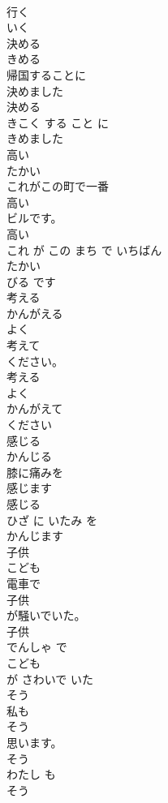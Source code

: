 \documentclass[8pt]{extreport}
\begin{document}
\begin{CJK}{UTF8}{min}
\\	行く	
\\	いく	
\\	決める	
\\	きめる	
\\	帰国することに
\\	決めました
\\	決める 
\\	きこく する こと に 
\\	きめました
\\	高い	
\\	たかい	
\\	これがこの町で一番
\\	高い
\\	ビルです。	
\\	高い 
\\	これ が この まち で いちばん 
\\	たかい
\\	びる です	
\\	考える	
\\	かんがえる	
\\	よく
\\	考えて
\\	ください。	
\\	考える 
\\	よく 
\\	かんがえて
\\	ください	
\\	感じる	
\\	かんじる	
\\	膝に痛みを
\\	感じます
\\	感じる 
\\	ひざ に いたみ を 
\\	かんじます
\\	子供	
\\	こども	
\\	電車で
\\	子供
\\	が騒いでいた。	
\\	子供 
\\	でんしゃ で 
\\	こども
\\	が さわいで いた	
\\	そう	
\\	私も
\\	そう
\\	思います。	
\\	そう 
\\	わたし も 
\\	そう

\end{CJK}
\end{document}
